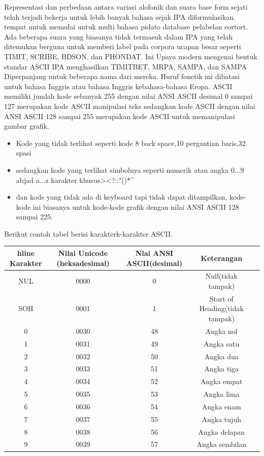 	Representasi dan perbedaan antara variasi alofonik dan suara base form sejati telah terjadi
	bekerja untuk lebih banyak bahasa sejak IPA diformulasikan. 
	tempat untuk memulai untuk multi bahasa pidato database pelabelan eortort.
	Ada beberapa suara yang biasanya tidak termasuk dalam IPA yang telah ditemukan
	berguna untuk memberi label pada corpora ucapan besar seperti TIMIT, SCRIBE, BDSON, dan PHONDAT. Ini
	Upaya modern mengenai bentuk standar ASCII IPA menghasilkan TIMITBET, MRPA, SAMPA, dan
	SAMPA Diperpanjang untuk beberapa nama dari mereka. Huruf fonetik ini dibatasi untuk bahasa Inggris atau bahasa Inggris kebahasa-bahasa Eropa.
	ASCII memiliki jumlah kode sebanyak 255 dengan nilai ANSI ASCII desimal 0 sampai 127 merupakan kode ASCII manipulasi teks sedangkan kode ASCII dengan nilai ANSI ASCII 128 sampai 255 merupakan kode ASCII untuk memanipulasi gambar grafik.
	\begin{itemize}
		\item Kode yang tidak terlihat seperti kode 8 back space,10 pergantian baris,32 spasi 
		\item sedangkan kode yang terlihat simbolnya seperti numerik atau angka 0...9 abjad a...z karakter khusus><?::"{}()*^%
		\item dan kode yang tidak ada di keyboard tapi tidak dapat ditampilkan, kode-kode ini biasanya untuk kode-kode grafik dengan nilai ANSI ASCII 128 sampai 225.
	\end{itemize} 

	Berikut contoh tabel berisi karakterk-karakter ASCII.
\begin{table}[H]
\begin{tabular}{|c|c|c|c|c|}
hline
Karakter & Nilai Unicode (heksadesimal) & Nlai ANSI ASCII(desimal) & Keterangan\\
\hline
NUL & 0000 & 0 & Null(tidak tampak)\\
SOH & 0001 & 1 & Start of Heading(tidak tampak)\\
0 & 0030 & 48 & Angka nol\\
1 & 0031 & 49 & Angka satu\\
2 & 0032 & 50 & Angka dua\\
3 & 0033 & 51 & Angka tiga\\
4 & 0034 & 52 & Angka empat\\
5 & 0035 & 53 & Angka lima\\
6 & 0036 & 54 & Angka enam\\
7 & 0037 & 55 & Angka tujuh\\
8 & 0038 & 56 & Angka delapan\\
9 & 0039 & 57 & Angka sembilan\\
\hline
\end{tabular}
\end{table}

